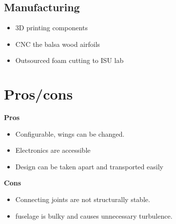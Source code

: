 \documentclass{report}
\begin{document}
\section{Manufacturing}
\begin{itemize}
    \item 3D printing components
    \item CNC the balsa wood airfoils
    \item Outsourced foam cutting to ISU lab
\end{itemize}
\chapter{Pros/cons}
\textbf{Pros}
\begin{itemize}
    \item Configurable, wings can be changed.
    \item Electronics are accessible
    \item Design can be taken apart and transported easily
\end{itemize}
\textbf{Cons}
\begin{itemize}
    \item Connecting joints are not structurally stable.
    \item fuselage is bulky and causes unnecessary turbulence.
\end{itemize}
\end{document}
